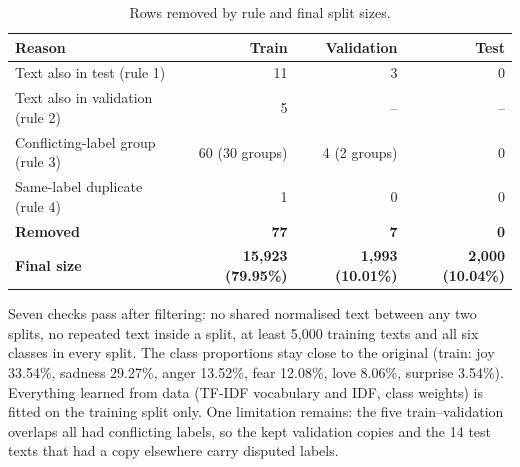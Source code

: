 \documentclass[11pt,a4paper]{article}
\begin{document}
\begin{table}[H]
\centering
\caption{Rows removed by rule and final split sizes.}
\label{tab:filter}
\begin{tabular}{@{}lrrr@{}}
\toprule
\textbf{Reason} & \textbf{Train} & \textbf{Validation} & \textbf{Test}\\
\midrule
Text also in test (rule 1) & 11 & 3 & 0\\
Text also in validation (rule 2) & 5 & -- & --\\
Conflicting-label group (rule 3) & 60 (30 groups) & 4 (2 groups) & 0\\
Same-label duplicate (rule 4) & 1 & 0 & 0\\
\midrule
\textbf{Removed} & \textbf{77} & \textbf{7} & \textbf{0}\\
\textbf{Final size} & \textbf{15,923 (79.95\%)} & \textbf{1,993 (10.01\%)} & \textbf{2,000 (10.04\%)}\\
\bottomrule
\end{tabular}
\end{table}

Seven checks pass after filtering: no shared normalised text between any two splits, no repeated text inside a split, at least 5,000 training texts and all six classes in every split. The class proportions stay close to the original (train: joy 33.54\%, sadness 29.27\%, anger 13.52\%, fear 12.08\%, love 8.06\%, surprise 3.54\%). Everything learned from data (TF-IDF vocabulary and IDF, class weights) is fitted on the training split only. One limitation remains: the five train--validation overlaps all had conflicting labels, so the kept validation copies and the 14 test texts that had a copy elsewhere carry disputed labels.
\end{document}
